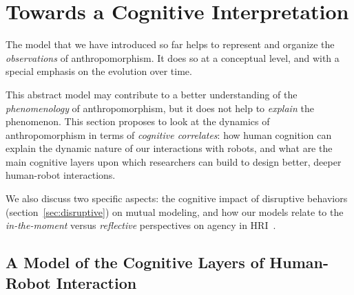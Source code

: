 \documentclass{frontiersSCNS} %
\begin{document}
%
%
%
%
%
%

\section{Towards a Cognitive Interpretation}
\label{sec:cognition-neuroscience}

The model that we have introduced so far helps to represent and organize the
\emph{observations} of anthropomorphism. It does so at a conceptual level, and
with a special emphasis on the evolution over time.

This abstract model may contribute to a better understanding of the
\emph{phenomenology} of anthropomorphism, but it does not help to \emph{explain}
the phenomenon. This section proposes to look at the dynamics of
anthropomorphism in terms of \emph{cognitive correlates}: how human cognition
can explain the dynamic nature of our interactions with robots, and what are the
main cognitive layers upon which researchers can build to design better, deeper
human-robot interactions.

We also discuss two specific aspects: the cognitive impact of disruptive
behaviors (section~\ref{sec:disruptive}) on mutual modeling, and how our models
relate to the \emph{in-the-moment} versus \emph{reflective} perspectives on
agency in HRI~\citep{takayama_perspectives_2012}.


\subsection{A Model of the Cognitive Layers of Human-Robot Interaction}
\label{sec:cognitive-model}
\end{document}
